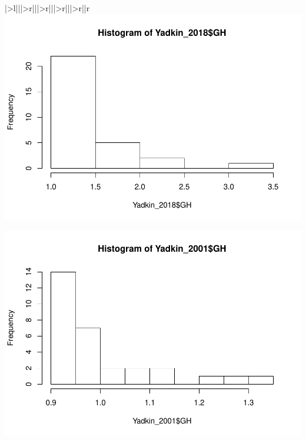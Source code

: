 \documentclass[
  12pt,
]{article}
\newenvironment{Shaded}{\begin{snugshade}}{\end{snugshade}}
\newcommand{\AttributeTok}[1]{\textcolor[rgb]{0.77,0.63,0.00}{#1}}
\newcommand{\CommentTok}[1]{\textcolor[rgb]{0.56,0.35,0.01}{\textit{#1}}}
\newcommand{\FunctionTok}[1]{\textcolor[rgb]{0.00,0.00,0.00}{#1}}
\newcommand{\NormalTok}[1]{#1}
\newcommand{\OtherTok}[1]{\textcolor[rgb]{0.56,0.35,0.01}{#1}}
\newcommand{\SpecialCharTok}[1]{\textcolor[rgb]{0.00,0.00,0.00}{#1}}
\begin{document}
\begin{table}
\begin{tabular}[t]{|>{}l|||>{}r|||>{}r|||>{}r|||>{}r||r}
\includegraphics{Project_Template_files/figure-latex/T-Test-1.pdf}

\begin{Shaded}
\end{Shaded}

\includegraphics{Project_Template_files/figure-latex/T-Test-2.pdf}

\begin{Shaded}
\end{Shaded}
\end{tabular}
\end{table}
\end{document}
